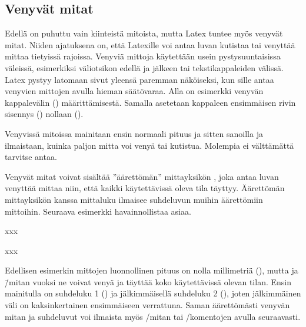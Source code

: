 \subsection{Venyvät mitat}

Edellä on puhuttu vain kiinteistä mitoista, mutta Latex tuntee myös
venyvät mitat. Niiden ajatuksena on, että Latexille voi antaa luvan
kutistaa tai venyttää mittaa tietyissä rajoissa. Venyviä mittoja
käytettään usein pystysuuntaisissa väleissä, esimerkiksi
väli\-ot\-si\-kon edellä ja jälkeen tai tekstikappaleiden välissä. Latex
pystyy latomaan sivut yleensä paremman näköiseksi, kun sille antaa
venyvien mittojen avulla hieman säätövaraa. Alla on esimerkki venyvän
kappalevälin () määrittämisestä. Samalla
asetetaan kappaleen ensimmäisen rivin sisennys () nollaan (\koodi{0em}).

\begin{koodilohkosis}
  \setlength{\parskip}{2ex plus 0.2ex minus 0.1ex}
  \setlength{\parindent}{0em}
\end{koodilohkosis}

Venyvissä mitoissa mainitaan ensin normaali pituus ja sitten sanoilla
 ja  ilmaistaan, kuinka paljon mitta voi venyä
tai kutistua. Molempia ei välttämättä tarvitse antaa.

Venyvät mitat voivat sisältää ''äärettömän'' mittayksikön ,
joka antaa luvan venyttää mittaa niin, että kaikki käytettävissä oleva
tila täyttyy. Äärettömän mittayksikön kanssa mittaluku ilmaisee
suhdeluvun muihin äärettömiin mittoihin. Seuraava esimerkki
havainnollistaa asiaa.

\pagebreak[3]

\begin{koodilohkosis}
  x\hspace{0mm plus 1fill}x\hspace{0mm plus 2fill}x
\end{koodilohkosis}

\begin{tulossis}
  x\hspace{0mm plus 1fill}x\hspace{0mm plus 2fill}x
\end{tulossis}

Edellisen esimerkin mittojen luonnollinen pituus on nolla millimetriä
(\koodi{0mm}), mutta  ja  \=/mitan vuoksi ne
voivat venyä ja täyttää koko käytettävissä olevan tilan. Ensin
mainitulla on suhdeluku 1 () ja jälkimmäisellä suhdeluku 2
(), joten jälkimmäinen väli on kaksinkertainen ensimmäiseen
verrattuna. Saman äärettömästi venyvän mitan ja suhdeluvut voi ilmaista
myös \-/mitan tai \-/komentojen
avulla seuraavasti.

